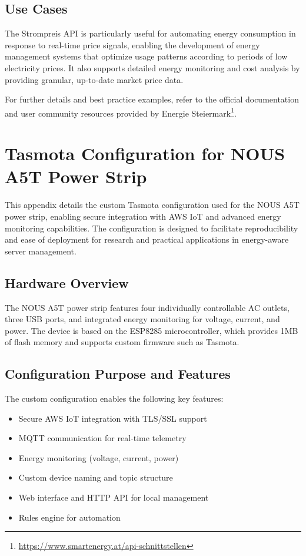 \subsection{Use Cases}
The Strompreis API is particularly useful for automating energy consumption in response to real-time price signals, enabling the development of energy management systems that optimize usage patterns according to periods of low electricity prices. It also supports detailed energy monitoring and cost analysis by providing granular, up-to-date market price data.

For further details and best practice examples, refer to the official documentation and user community resources provided by Energie Steiermark\footnote{\url{https://www.smartenergy.at/api-schnittstellen}}.

\newpage
\section{Tasmota Configuration for NOUS A5T Power Strip}
\label{appendix:tasmota-config}

This appendix details the custom Tasmota configuration used for the NOUS A5T power strip, enabling secure integration with AWS IoT and advanced energy monitoring capabilities. The configuration is designed to facilitate reproducibility and ease of deployment for research and practical applications in energy-aware server management.

\subsection{Hardware Overview}
The NOUS A5T power strip features four individually controllable AC outlets, three USB ports, and integrated energy monitoring for voltage, current, and power. The device is based on the ESP8285 microcontroller, which provides 1MB of flash memory and supports custom firmware such as Tasmota.

\subsection{Configuration Purpose and Features}
The custom configuration enables the following key features:
\begin{itemize}
    \item Secure AWS IoT integration with TLS/SSL support
    \item MQTT communication for real-time telemetry
    \item Energy monitoring (voltage, current, power)
    \item Custom device naming and topic structure
    \item Web interface and HTTP API for local management
    \item Rules engine for automation
\end{itemize}

